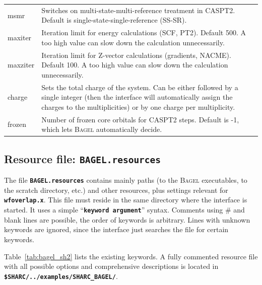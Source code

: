\documentclass[a4paper,10pt,DIV=15,openany]{scrbook}
\newcommand{\ttt}[1]{\textbf{\texttt{#1}}}
\begin{document}
\begin{table}
\begin{tabular}{>{\ttfamily}lp{12cm}}
msmr                    &Switches on multi-state-multi-reference treatment in CASPT2. Default is single-state-single-reference (SS-SR).
\\
maxiter                 &Iteration limit for energy calculations (SCF, PT2). Default 500. A too high value can slow down the calculation unnecessarily.
\\
maxziter                &Iteration limit for Z-vector calculations (gradients, NACME). Default 100. A too high value can slow down the calculation unnecessarily.
\\
charge                  &Sets the total charge of the system. Can be either followed by a single integer (then the interface will automatically assign the charges to the multiplicities) or by one charge per multiplicity. 
\\
frozen                  &Number of frozen core orbitals for CASPT2 steps. Default is -1, which lets \textsc{Bagel} automatically decide.
\\
  \hline
  \end{tabular}
\end{table}


\subsection{Resource file: \ttt{BAGEL.resources}}

The file \ttt{BAGEL.resources} contains mainly paths (to the \textsc{Bagel} executables, to the scratch directory, etc.) and other resources, plus settings relevant for \ttt{wfoverlap.x}. This file must reside in the same directory where the interface is started. It uses a simple ``\ttt{keyword argument}'' syntax. Comments using \# and blank lines are possible, the order of keywords is arbitrary. Lines with unknown keywords are ignored, since the interface just searches the file for certain keywords.

Table~\ref{tab:bagel_sh2} lists the existing keywords.
A fully commented resource file with all possible options and comprehensive descriptions is located in \ttt{\$SHARC/../examples/SHARC\_BAGEL/}.
\end{document}
